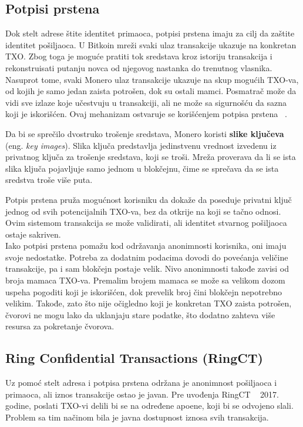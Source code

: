 \documentclass[12pt,a4paper]{article}
\begin{document}
\subsection{Potpisi prstena}
Dok stelt adrese štite identitet primaoca, potpisi prstena imaju za cilj da zaštite identitet pošiljaoca. U Bitkoin mreži svaki ulaz transakcije ukazuje na konkretan TXO. Zbog toga je moguće pratiti tok sredstava kroz istoriju transakcija i rekonstruisati putanju novca od njegovog nastanka do trenutnog vlasnika.\\

Nasuprot tome, svaki Monero ulaz transakcije ukazuje na skup mogućih TXO-va, od kojih je samo jedan zaista potrošen, dok su ostali mamci. Posmatrač može da vidi sve izlaze koje učestvuju u transakciji, ali ne može sa sigurnošću da sazna koji je iskorišćen. Ovaj mehanizam ostvaruje se korišćenjem potpisa prstena ~\cite{mrl4}.

Da bi se sprečilo dvostruko trošenje sredstava, Monero koristi \textbf{slike ključeva} (eng. \textit{key images}). Slika ključa predstavlja jedinstvenu vrednost izvedenu iz privatnog ključa za trošenje sredstava, koji se troši. Mreža proverava da li se ista slika ključa pojavljuje samo jednom u blokčejnu, čime se sprečava da se ista sredstva troše više puta.

Potpis prstena pruža mogućnost korisniku da dokaže da poseduje privatni ključ jednog od svih potencijalnih TXO-va, bez da otkrije na koji se tačno odnosi. Ovim sistemom transakcija se može validirati, ali identitet stvarnog pošiljaoca ostaje sakriven.\\ 

Iako potpisi prstena pomažu kod održavanja anonimnosti korisnika, oni imaju svoje nedostatke. Potreba za dodatnim podacima dovodi do povećanja veličine transakcije, pa i sam blokčejn postaje velik. Nivo anonimnosti takođe zavisi od broja mamaca TXO-va. Premalim brojem mamaca se može sa velikom dozom uspeha pogoditi koji je iskorišćen, dok prevelik broj čini blokčejn nepotrebno velikim. Takođe, zato što nije očigledno koji je konkretan TXO zaista potrošen, čvorovi ne mogu lako da uklanjaju stare podatke, što dodatno zahteva više resursa za pokretanje čvorova.

\subsection{Ring Confidential Transactions (RingCT)}
Uz pomoć stelt adresa i potpisa prstena održana je anonimnost pošiljaoca i primaoca, ali iznos transakcije ostao je javan. Pre uvođenja RingCT ~\cite{mrl5} 2017. godine, poslati TXO-vi delili bi se na određene apoene, koji bi se odvojeno slali. Problem sa tim načinom bila je javna dostupnost iznosa svih transakcija.\\ 
\end{document}
